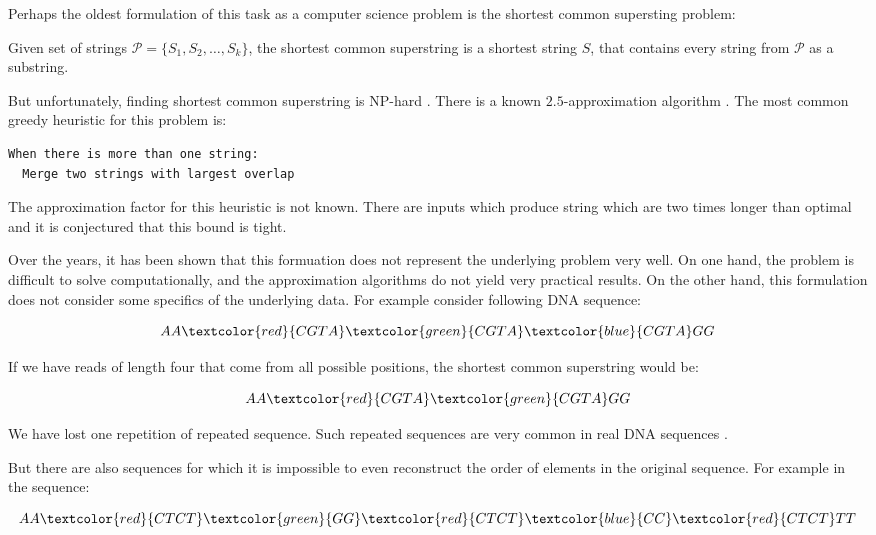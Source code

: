 Perhaps the oldest formulation of this task as a computer science
problem is the shortest common supersting problem:

\begin{definition}
Given set of strings $\mathcal{P} = \{S_1, S_2, \dots, S_k\}$, the shortest
common superstring is a shortest string $S$, that contains every string
from $\mathcal{P}$ as a substring.
\end{definition}

But unfortunately, finding shortest common superstring is NP-hard \citep{SCShard}.
There is a known $2.5$-approximation algorithm \citep{SCSapx}.
The most common greedy heuristic for this problem is:
\begin{verbatim}
When there is more than one string:
  Merge two strings with largest overlap
\end{verbatim}

The approximation factor for this heuristic is not known. There are inputs
which produce string which are two times longer than optimal
and it is conjectured that this bound is tight.

\medskip

Over the years, it has been shown
that this formuation does not represent the underlying problem very well.
On one hand, the problem is difficult to solve computationally, and the
approximation algorithms do not yield very practical results.
On the other hand, this formulation does not consider some specifics of the underlying data.
For example consider following DNA sequence:

$$AA\textcolor{red}{CGTA}\textcolor{green}{CGTA}\textcolor{blue}{CGTA}GG$$

If we have reads of length four that come from all possible positions, the shortest
common superstring would be:

$$AA\textcolor{red}{CGTA}\textcolor{green}{CGTA}GG$$

We have lost one repetition of repeated sequence. Such repeated sequences are
very common in real DNA sequences \citep{DNARep}.


But there are also sequences for which it is impossible to even 
reconstruct the order of elements
in the original sequence. For example in the sequence:

$$AA\textcolor{red}{CTCT}\textcolor{green}{GG}\textcolor{red}{CTCT}\textcolor{blue}{CC}\textcolor{red}{CTCT}TT$$

